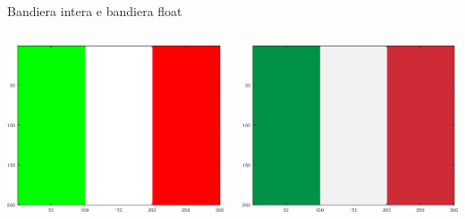 \documentclass[aspectratio=169]{beamer}
\begin{document}
\begin{frame}{Bandiera intera e bandiera float}
    \begin{columns}
        \begin{column}{0.5\textwidth}
            \includegraphics[width=0.9\linewidth]{./bandiera1.png}
        \end{column}
        \begin{column}{0.5\textwidth}
            \includegraphics[width=0.9\linewidth]{./bandiera2.png}
        \end{column}
    \end{columns}
\end{frame}
\end{document}
